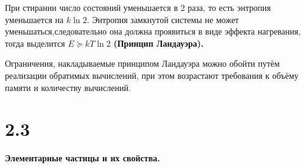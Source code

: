 \documentclass[a4paper,14pt]{article}
\begin{document}
При стирании число состояний уменьшается в 2 раза, то есть энтропия уменьшается на $k \ln 2$.
Энтропия замкнутой системы не может уменьшаться,следовательно она должна проявиться в виде эффекта нагревания, тогда выделится $E\succeq k T \ln 2$ \textbf{(Принцип Ландауэра).}

Ограничения, накладываемые принципом Ландауэра можно обойти путём реализации обратимых вычислений, при этом возрастают требования к объёму памяти и количеству вычислений.

\section*{2.3}
\begin{center}
	\LARGE{\textbf{Элементарные частицы и их свойства.}}\\
\end{center}
\end{document}
